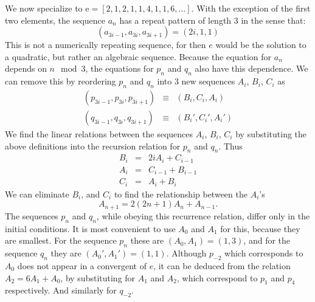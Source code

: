 \documentclass{article}
\theoremstyle{theorem}
\theoremstyle{definition}
\begin{document}
We now specialize to $\mathrm{e}= [2, 1, 2, 1, 1, 4, 1, 1, 6, \ldots]$. 
With the exception of the first two elements, the sequence $a_n$ has a repeat pattern of length 3 in the sense that:
$$ (a_{3i-1}, a_{3i}, a_{3i+1} )= (2  i, 1, 1) $$
This is not a numerically repeating sequence, for then $e$ would be the solution to a quadratic, but rather an algebraic sequence.
Because the equation for $a_n$ depends on $n\! \mod 3$, the equations for $p_n$ and $q_n$ also have this dependence. We can remove this by reordering $p_n$ and $q_n$ into 3 new sequences $A_i$, $B_i$, $C_i$ as
\begin{eqnarray*}
(p_{3i-1}, p_{3i}, p_{3i+1} ) &\equiv& (B_i, C_i, A_i) \\
(q_{3i-1}, q_{3i}, q_{3i+1} ) &\equiv& (B_i', C_i', A_i')
\end{eqnarray*}
We find the linear relations between the sequences $A_i$, $B_i$, $C_i$ by substituting the above definitions into the recursion relation for $p_n$ and $q_n$. Thus
\begin{eqnarray*}
B_i &=& 2  i  A_i    + C_{i-1} \\
A_i &=&            C_{i-1} + B_{i-1} \\
C_i &=&            A_i     + B_i
\end{eqnarray*}
We can eliminate $B_i$, and $C_i$ to find the relationship between the $A_i$'s
$$ A_{n+1} = 2  (2  n + 1) A_n + A_{n-1}. $$
The sequences $p_n$ and $q_n$, while obeying this recurrence relation, differ only in the initial conditions. It is most convenient to use $A_0$ and $A_1$ for this, because they are smallest. For the sequence $p_n$ these are $(A_0, A_1) = (1, 3)$, and for the sequence $q_n$ they are $(A_0', A_1') = (1, 1)$. Although $p_{-2}$ which corresponds to $A_0$ does not appear in a convergent of $e$, it can be deduced from the relation $A_2 = 6  A_1 + A_0$, by substituting for $A_1$ and $A_2$, which correspond to $p_1$ and $p_4$ respectively. And similarly for $q_{-2}$.
\end{document}
